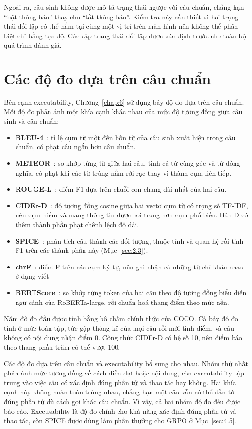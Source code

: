 Ngoài ra, câu sinh không được mô tả trạng thái ngược với câu chuẩn, chẳng hạn ``bật thông báo'' thay cho ``tắt thông báo''. Kiểm tra này cần thiết vì hai trạng thái đối lập có thể nằm tại cùng một vị trí trên màn hình nên không thể phân biệt chỉ bằng tọa độ. Các cặp trạng thái đối lập được xác định trước cho toàn bộ quá trình đánh giá.

\section{Các độ đo dựa trên câu chuẩn}\label{sec:5.11}

Bên cạnh executability, Chương~\ref{chap:6} sử dụng bảy độ đo dựa trên câu chuẩn. Mỗi độ đo phản ánh một khía cạnh khác nhau của mức độ tương đồng giữa câu sinh và câu chuẩn:
\begin{itemize}
\item \textbf{BLEU-4}~\cite{bleu}: tỉ lệ cụm từ một đến bốn từ của câu sinh xuất hiện trong câu chuẩn, có phạt câu ngắn hơn câu chuẩn.
\item \textbf{METEOR}~\cite{meteor}: so khớp từng từ giữa hai câu, tính cả từ cùng gốc và từ đồng nghĩa, có phạt khi các từ trùng nằm rời rạc thay vì thành cụm liên tiếp.
\item \textbf{ROUGE-L}~\cite{rouge}: điểm F1 dựa trên chuỗi con chung dài nhất của hai câu.
\item \textbf{CIDEr-D}~\cite{cider}: độ tương đồng cosine giữa hai vectơ cụm từ có trọng số TF-IDF, nên cụm hiếm và mang thông tin được coi trọng hơn cụm phổ biến. Bản D có thêm thành phần phạt chênh lệch độ dài.
\item \textbf{SPICE}~\cite{spice}: phân tích câu thành các đối tượng, thuộc tính và quan hệ rồi tính F1 trên các thành phần này (Mục~\ref{sec:2.3}).
\item \textbf{chrF}~\cite{chrf}: điểm F trên các cụm ký tự, nên ghi nhận cả những từ chỉ khác nhau ở dạng viết.
\item \textbf{BERTScore}~\cite{bertscore}: so khớp từng token của hai câu theo độ tương đồng biểu diễn ngữ cảnh của RoBERTa-large, rồi chuẩn hoá thang điểm theo mức nền.
\end{itemize}
Năm độ đo đầu được tính bằng bộ chấm chính thức của COCO. Cả bảy độ đo tính ở mức toàn tập, tức gộp thống kê của mọi câu rồi mới tính điểm, và câu không có nội dung nhận điểm 0. Công thức CIDEr-D có hệ số 10, nên điểm báo theo thang phần trăm có thể vượt 100.

Các độ đo dựa trên câu chuẩn và executability bổ sung cho nhau. Nhóm thứ nhất phản ánh mức tương đồng về cách diễn đạt hoặc nội dung, còn executability tập trung vào việc câu có xác định đúng phần tử và thao tác hay không. Hai khía cạnh này không hoàn toàn trùng nhau, chẳng hạn một câu vẫn có thể dẫn tới đúng phần tử dù cách gọi khác câu chuẩn. Vì vậy, cả hai nhóm độ đo đều được báo cáo. Executability là độ đo chính cho khả năng xác định đúng phần tử và thao tác, còn SPICE được dùng làm phần thưởng cho GRPO ở Mục~\ref{sec:4.5}.

